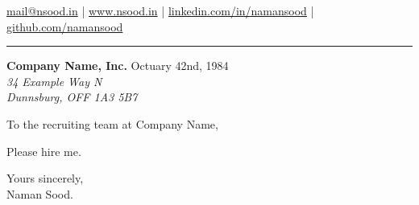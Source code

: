 \documentclass{article}
\begin{document}
    
{\hfill \href{mailto:mail@nsood.in}{mail@nsood.in} | 
        \href{https://www.nsood.in}{www.nsood.in} | 
        \href{https://linkedin.com/in/namansood}{linkedin.com/in/namansood} |
        \href{https://github.com/namansood}{github.com/namansood}
\hfill}

\vspace{12pt}
\rule{7.2in}{1pt}


\setlength\parskip{12pt plus 4pt minus 4pt}

\textbf{Company Name, Inc.} \hfill Octuary 42nd, 1984 \\ \emph{34 Example Way N \\ Dunnsburg, OFF 1A3 5B7}

To the recruiting team at Company Name,

Please hire me.

Yours sincerely,\\
Naman Sood.
\end{document}
